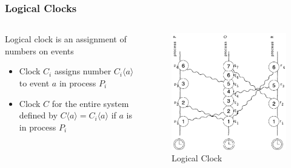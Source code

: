 \documentclass{beamer}
\begin{document}
\frame
{
	\frametitle{Logical Clocks}

	\begin{columns}
	\begin{column}{0.6\textwidth}

		Logical clock is an assignment of numbers on events
		\begin{itemize}
			\item<2-> Clock $C_i$ assigns number $C_i\langle a\rangle$ to event $a$ in process $P_i$
			\item<3-> Clock $C$ for the entire system defined by $C\langle a\rangle=C_i\langle a\rangle$ if $a$ is in process $P_i$
		\end{itemize}


	\end{column}
	\begin{column}{0.4\textwidth}

		\begin{figure}[ht!]
		\includegraphics[width=\textwidth]{files/ClockDist-Logical-Clock.png}
		\caption{Logical Clock}
		\end{figure}


	\end{column}
	\end{columns}


}
\end{document}
